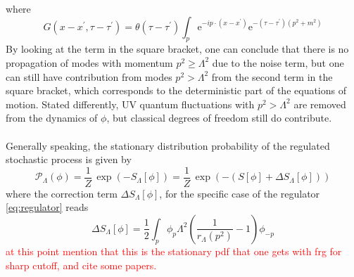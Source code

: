 where
\begin{equation*}
    G\left(x-x^{\prime}, \tau-\tau^{\prime}\right) =\theta\left(\tau-\tau^{\prime}\right) \int_p \mathrm{e}^{-i p \cdot\left(x-x^{\prime}\right)} \mathrm{e}^{-\left(\tau-\tau^{\prime}\right)\left(p^2+m^2\right)}
\end{equation*}
By looking at the term in the square bracket, one can conclude that there is no propagation of modes with momentum $p^2\geq \Lambda^2$ due to the noise term, but one can still have contribution from modes $p^2 > \Lambda^2$ from the second term in the square bracket, which corresponds to the deterministic part of the equations of motion. Stated differently, UV quantum fluctuations with $p^2 > \Lambda^2$ are removed from the dynamics of $\phi$, but classical degrees of freedom still do contribute. \\~\\
Generally speaking, the stationary distribution probability of the regulated stochastic process is given by
\begin{equation}
    \mathcal{P}_\Lambda(\phi) = \frac{1}{Z} \, \exp\left(-S_\Lambda[\phi]\right) = \frac{1}{Z} \, \exp\left(-(S[\phi] + \Delta S_\Lambda[\phi])\right)
    \label{eq:probability_field_configuration_regularised}
\end{equation}
where the correction term $\Delta S_\Lambda[\phi]$, for the specific case of the regulator \eqref{eq:regulator} reads
\begin{equation*}
        \Delta S_{\Lambda}[\phi]=\frac{1}{2} \int_p \phi_p \Lambda^2\left(\frac{1}{r_{\Lambda}\left(p^2\right)}-1\right) \phi_{-p}
\end{equation*}
\textcolor{red}{at this point mention that this is the stationary pdf that one gets with frg for sharp cutoff, and cite some papers.}

